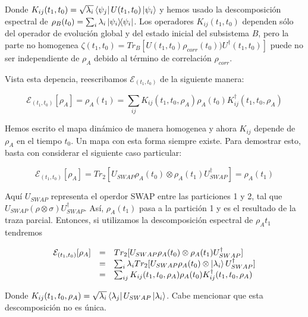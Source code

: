 Donde $K_{ij}(t_1, t_0) = \sqrt{\lambda_i} \bra{\psi_j} U(t_1, t_0) \ket{\psi_i}$ y hemos usado la descomposición espectral de $\rho_B(t_0) = \sum_i \lambda_i \ketbra{\psi_i}$. Los operadores $K_{ij}(t_1, t_0)$ dependen sólo del operador de evolución global y del estado inicial del subsistema $B$, pero la parte no homogenea $\zeta(t_1, t_0) = Tr_B[U(t_1, t_0) \rho_{corr}(t_0)) U^\dagger(t_1, t_0)]$ puede no ser independiente de $\rho_A$ debido al término de correlación $\rho_{corr}$.

Vista esta depencia, reescribamos $\mathcal{E}_{(t_1, t_0)}$ de la siguiente manera:

\begin{equation}
    \mathcal{E}_{(t_1, t_0)}[\rho_A] = \rho_A(t_1) = \sum_{ij} K_{ij}(t_1, t_0, \rho_A) \rho_A(t_0) K^\dagger_{ij}(t_1, t_0, \rho_A)
\end{equation}

Hemos escrito el mapa dinámico de manera homogenea y ahora $K_{ij}$ depende de $\rho_A$ en el tiempo $t_0$. Un mapa con esta forma siempre existe. Para demostrar esto, basta con considerar el siguiente caso particular:

\begin{equation}
    \mathcal{E}_{(t_1, t_0)}[\rho_A] = Tr_2[U_{SWAP} \rho_A(t_0) \otimes \rho_A(t_1) U_{SWAP}^\dagger] = \rho_A(t_1)
\end{equation}

Aquí $U_{SWAP}$ representa el operdor SWAP entre las particiones 1 y 2, tal que $U_{SWAP} (\rho \otimes \sigma) U_{SWAP}^\dagger$. Así, $\rho_A(t_1)$ pasa a la partición 1 y es el resultado de la traza parcial. Entonces, si utilizamos la descomposición espectral de $\rho_A{t_1}$ tendremos

\begin{equation}
    \begin{array}{r c l}
        \mathcal{E}_{(t_1, t_0)}[\rho_A]
        &=& Tr_2[U_{SWAP} \rho_A(t_0) \otimes \rho_A(t_1) U_{SWAP}^\dagger] \\
        &=& \sum_i \lambda_i Tr_2[U_{SWAP} \rho_A(t_0) \otimes \ket{\lambda_i} U_{SWAP}^\dagger] \\
        &=& \sum_{ij} K_{ij}(t_1, t_0, \rho_A) \rho_A(t_0) K^\dagger_{ij}(t_1, t_0, \rho_A)
    \end{array}
\end{equation}

Donde $K_{ij}(t_1, t_0, \rho_A) = \sqrt{\lambda_i} \bra{\lambda_j} U_{SWAP} \ket{\lambda_i}$. Cabe mencionar que esta descomposición no es única.

